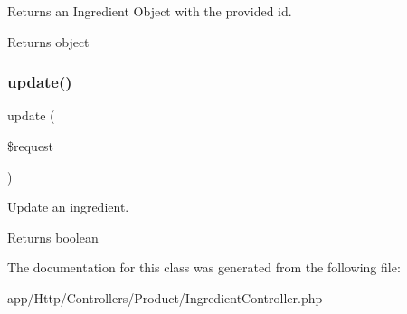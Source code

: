 Returns an Ingredient Object with the provided id.

\begin{DoxyReturn}{Returns}
object 
\end{DoxyReturn}
\mbox{\label{class_app_1_1_http_1_1_controllers_1_1_product_1_1_ingredient_controller_ab7b27a90191560dcef32126b0945db0d}} 
\subsubsection{\texorpdfstring{update()}{update()}}
{\footnotesize\ttfamily update (\begin{DoxyParamCaption}\item[{}]{\$request }\end{DoxyParamCaption})}

Update an ingredient.

\begin{DoxyReturn}{Returns}
boolean 
\end{DoxyReturn}


The documentation for this class was generated from the following file\+:\begin{DoxyCompactItemize}
\item 
app/\+Http/\+Controllers/\+Product/Ingredient\+Controller.\+php\end{DoxyCompactItemize}
